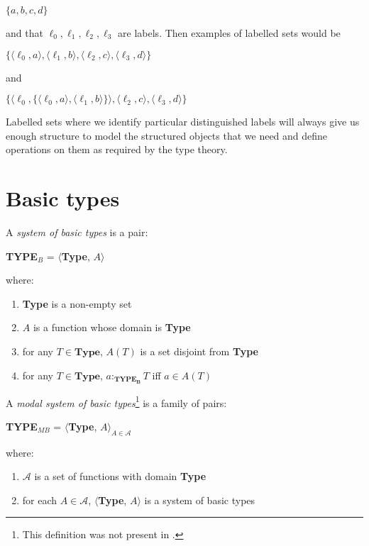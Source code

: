 $\{a,b,c,d\}$

and that $\ell_0,\ell_1,\ell_2,\ell_3$ are labels.  Then examples of
labelled sets would be

$\{\langle\ell_0,a\rangle,\langle\ell_1,b\rangle,\langle\ell_2,c\rangle,\langle\ell_3,d\rangle\}$

and

$\{\langle\ell_0,\{\langle\ell_0,a\rangle,\langle\ell_1,b\rangle\}\rangle,\langle\ell_2,c\rangle,\langle\ell_3,d\rangle\}$

Labelled sets where we identify particular distinguished labels will
always give us enough structure to model the structured objects that
we need and define operations on them as required by the type theory.


\section{Basic types}
\label{sec:basic}

A {\it system of basic types\/} is a pair:
\begin{display}
{\bf TYPE$_B$} = $\langle${\bf Type}, $A$$\rangle$
\end{display}
where:
\begin{enumerate} 
 
\item \textbf{Type} is a non-empty set 
 
\item $A$ is a function whose domain is \textbf{Type}

\item for any $T\in\textbf{Type}$, $A(T)$ is a set disjoint from
  \textbf{Type}

\item for any $T\in\textbf{Type}$, $a:_{\mathbf{TYPE_B}}T$ iff $a\in A(T)$
 
\end{enumerate}

A \textit{modal system of basic types}\footnote{This definition was not present in \cite{Cooper2012}.} is a family of
pairs:
\begin{display}
\textbf{TYPE$_{\mathit{MB}}$} = $\langle${\bf Type},
$A\rangle_{A\in\mathcal{A}}$
\end{display}
where:
\begin{enumerate} 
 
\item $\mathcal{A}$ is a set of functions with domain \textbf{Type} 
 
\item for each $A\in\mathcal{A}$, $\langle${\bf Type}, $A\rangle$ is a
  system of basic types
 
\end{enumerate} 

